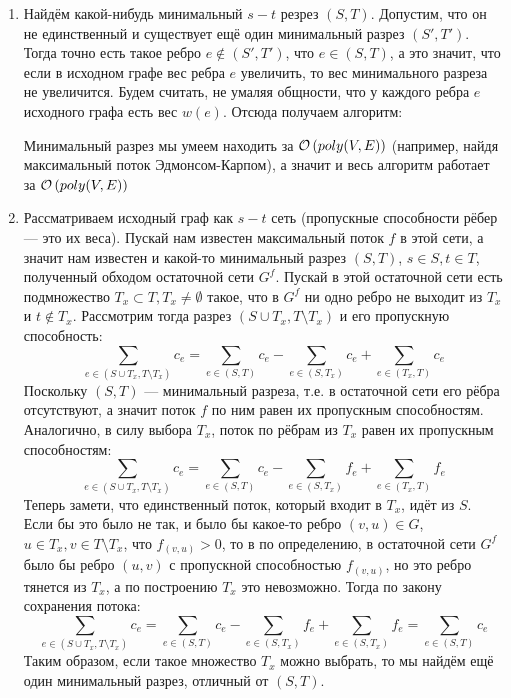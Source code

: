 \begin{solution}
\begin{enumerate}
	\item Найдём какой-нибудь минимальный $s-t$ резрез $(S, T)$. Допустим, что он не единственный и существует ещё один минимальный разрез $(S', T')$. Тогда точно есть такое ребро $e \notin (S', T')$, что $e \in (S, T)$, а это значит, что если в исходном графе вес ребра $e$ увеличить, то вес минимального разреза не увеличится. Будем считать, не умаляя общности, что у каждого ребра $e$ исходного графа есть вес $w(e)$. Отсюда получаем алгоритм:
	\begin{algorithmic}
		\EndIf
	\EndFor
	\end{algorithmic}
	Минимальный разрез мы умеем находить за $\mathcal{O}\left(poly(V, E)\right)$  (например, найдя максимальный поток Эдмонсом-Карпом),
	а значит и весь алгоритм работает за $\mathcal{O}\left(poly(V, E)\right)$ \xqed

	\item Рассматриваем исходный граф как $s-t$ сеть (пропускные способности рёбер --- это их веса). Пускай нам известен максимальный поток $f$ в этой сети, а значит нам известен и какой-то минимальный разрез $(S, T)$, $s \in S, t \in T$, полученный обходом остаточной сети $G^f$. Пускай в этой остаточной сети есть подмножество $T_x \subset T, T_x \neq \emptyset$ такое, что в $G^f$ ни одно ребро не выходит из $T_x$ и $t \notin T_x$. Рассмотрим тогда разрез $(S \cup T_x, T \setminus T_x)$ и его пропускную способность:
	\[
		\sum_{e \in (S \cup T_x, T \setminus T_x)}{c_e} = \sum_{e \in (S, T)}{c_e} - \sum_{e \in (S, T_x)}{c_e} + \sum_{e \in (T_x, T)}{c_e}
	\]
	Поскольку $(S, T)$ --- минимальный разреза, т.е. в остаточной сети его рёбра отсутствуют, а значит поток $f$ по ним равен их пропускным способностям. Аналогично, в силу выбора $T_x$, поток по рёбрам из $T_x$ равен их пропускным способностям:
	\[
		\sum_{e \in (S \cup T_x, T \setminus T_x)}{c_e} = \sum_{e \in (S, T)}{c_e} - \sum_{e \in (S, T_x)}{f_e} + \sum_{e \in (T_x, T)}{f_e}
	\]
	Теперь замети, что единственный поток, который входит в $T_x$, идёт из $S$. Если бы это было не так, и было бы какое-то ребро $(v, u)$$ \in G$, $u \in T_x, v \in T \setminus T_x$, что $f_{(v,u)} > 0$, то в по определению, в остаточной сети $G^f$ было бы ребро $(u, v)$ с пропускной способностью $f_{(v, u)}$, но это ребро тянется из $T_x$, а по построению $T_x$ это невозможно. Тогда по закону сохранения потока:
	\[
		\sum_{e \in (S \cup T_x, T \setminus T_x)}{c_e} = \sum_{e \in (S, T)}{c_e} - \sum_{e \in (S, T_x)}{f_e} + \sum_{e \in (S, T_x)}{f_e} = \sum_{e \in (S, T)}{c_e}
	\]
	Таким образом, если такое множество $T_x$ можно выбрать, то мы найдём ещё один минимальный разрез, отличный от $(S, T)$.


\end{enumerate}
\end{solution}
